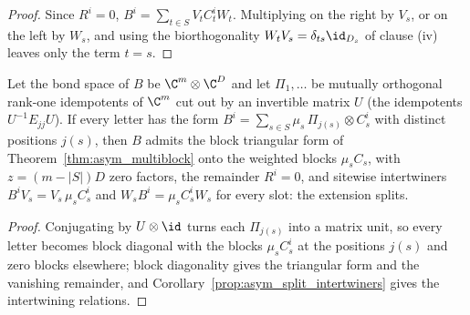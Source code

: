 \begin{proof}
    \leanok
    Since $R^i=0$, $B^i=\sum_{t\in S}V_tC_t^iW_t$. Multiplying on the
    right by $V_s$, or on the left by $W_s$, and using the
    biorthogonality $W_tV_s=\delta_{ts}\id_{D_s}$ of clause (iv) leaves
    only the term $t=s$.
\end{proof}

\begin{corollary}
    \label{prop:asym_projector_weighted_sum}
    \leanok
    Let the bond space of $B$ be $\C^m\otimes\C^{D}$ and let $\Pi_1,\ldots$
    be mutually orthogonal rank-one idempotents of $\C^m$ cut out by an
    invertible matrix $U$ (the idempotents $U^{-1}E_{jj}U$). If every
    letter has the form
    $B^i=\sum_{s\in S}\mu_s\,\Pi_{j(s)}\otimes C_s^i$ with distinct
    positions $j(s)$, then $B$ admits the block triangular form of
    Theorem~\ref{thm:asym_multiblock} onto the weighted blocks $\mu_sC_s$,
    with $z=(m-|S|)D$ zero factors, the remainder $R^i=0$, and sitewise
    intertwiners $B^iV_s=V_s\,\mu_sC_s^i$ and $W_sB^i=\mu_sC_s^iW_s$ for
    every slot: the extension splits.
\end{corollary}

\begin{proof}
    \leanok
    Conjugating by $U\otimes\id$ turns each $\Pi_{j(s)}$ into a matrix
    unit, so every letter becomes block diagonal with the blocks
    $\mu_sC_s^i$ at the positions $j(s)$ and zero blocks elsewhere; block
    diagonality gives the triangular form and the vanishing remainder, and
    Corollary~\ref{prop:asym_split_intertwiners} gives the intertwining
    relations.
\end{proof}

